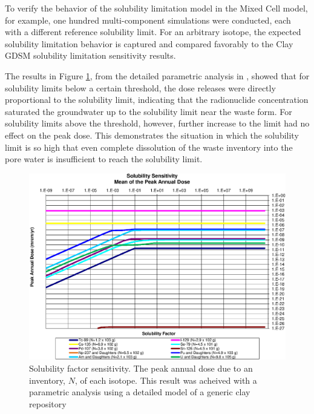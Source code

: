 To verify the behavior of the solubility limitation model in the Mixed Cell
model, for example, one hundred multi-component simulations were conducted,
each with a different reference solubility limit.
For an arbitrary isotope, the expected solubility
limitation behavior is captured and compared favorably to the Clay \gls{GDSM}
solubility limitation sensitivity results.

The results in Figure \ref{fig:SolSumFactor}, from the detailed parametric
analysis in \cite{huff_key_2012}, showed that for solubility limits below a
certain threshold, the dose releases were directly proportional to the
solubility limit, indicating that the radionuclide concentration saturated the
groundwater up to the solubility limit near the waste form.  For solubility
limits above the threshold, however, further increase to the limit had no
effect on the peak dose. This demonstrates the situation in which the
solubility limit is so high that even complete dissolution of the waste
inventory into the pore water is insufficient to reach the solubility limit.


\begin{figure}[ht]
\begin{center}
\includegraphics[width=0.7\linewidth]{./results/images/Solubility_Summary_SolFactor.eps}
\caption[Solubility factor sensitivity in the Clay GDSM model]{Solubility
factor sensitivity. The peak annual dose due to an inventory, $N$, of each
isotope. This result was acheived with a parametric analysis using a detailed
model of a generic clay repository \cite{huff_key_2012}}
\label{fig:SolSumFactor}
\end{center}
\end{figure}


